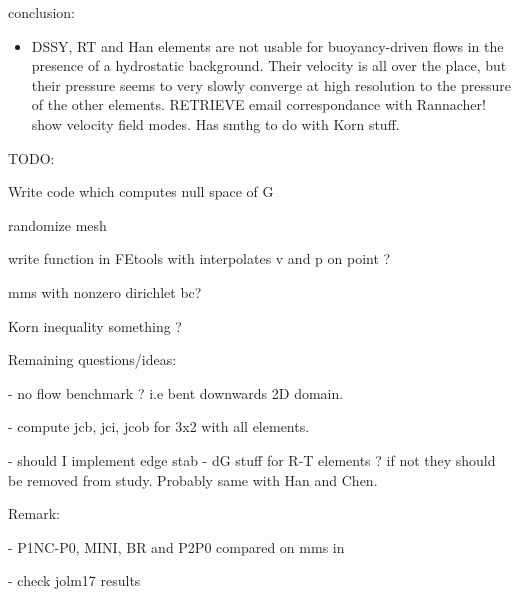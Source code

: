 
conclusion:

\begin{itemize}
\item DSSY, RT and Han elements are not usable for buoyancy-driven flows in the presence of a hydrostatic 
background. Their velocity is all over the place, but their pressure seems to very slowly 
converge at high resolution to the pressure of the other elements.
RETRIEVE email correspondance with Rannacher! show velocity field modes. Has smthg to do with 
Korn stuff.
\end{itemize}















\newpage
TODO:

Write code which computes null space of G 

randomize mesh

write function in FEtools with interpolates v and p on point ?

mms with nonzero dirichlet bc?

Korn inequality something ?



Remaining questions/ideas:

- no flow benchmark ? i.e bent downwards 2D domain. 

- compute jcb, jci, jcob for 3x2 with all elements.

- should I implement edge stab - dG stuff for R-T elements ? if not they should be  
removed from study. Probably same with Han and Chen.

Remark:

- P1NC-P0, MINI, BR and P2P0 compared on mms in \cite{cakp15}

- check jolm17 results

